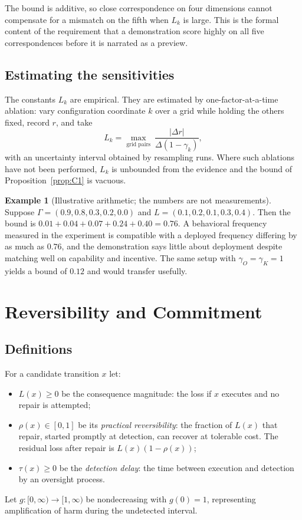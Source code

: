 \documentclass[11pt]{article}
\theoremstyle{definition}
\newtheorem{example}[theorem]{Example}
\begin{document}
The bound is additive, so close correspondence on four dimensions cannot compensate for a mismatch on the fifth when $L_k$ is large. This is the formal content of the requirement that a demonstration score highly on all five correspondences before it is narrated as a preview.

\subsection{Estimating the sensitivities}

The constants $L_k$ are empirical. They are estimated by one-factor-at-a-time ablation: vary configuration coordinate $k$ over a grid while holding the others fixed, record $r$, and take
\[
\hat L_k=\max_{\text{grid pairs}}\ \frac{|\Delta r|}{\Delta(1-\gamma_k)},
\]
with an uncertainty interval obtained by resampling runs. Where such ablations have not been performed, $L_k$ is unbounded from the evidence and the bound of Proposition~\ref{prop:C1} is vacuous.

\begin{example}[Illustrative arithmetic; the numbers are not measurements]
Suppose $\Gamma=(0.9,0.8,0.3,0.2,0.0)$ and $L=(0.1,0.2,0.1,0.3,0.4)$. Then the bound is $0.01+0.04+0.07+0.24+0.40=0.76$. A behavioral frequency measured in the experiment is compatible with a deployed frequency differing by as much as $0.76$, and the demonstration says little about deployment despite matching well on capability and incentive. The same setup with $\gamma_O=\gamma_K=1$ yields a bound of $0.12$ and would transfer usefully.
\end{example}

\section{Reversibility and Commitment}\label{app:D}

\subsection{Definitions}

For a candidate transition $x$ let:
\begin{itemize}[leftmargin=1.6em,itemsep=0.1em]
\item $L(x)\ge0$ be the consequence magnitude: the loss if $x$ executes and no repair is attempted;
\item $\rho(x)\in[0,1]$ be its \emph{practical reversibility}: the fraction of $L(x)$ that repair, started promptly at detection, can recover at tolerable cost. The residual loss after repair is $L(x)(1-\rho(x))$;
\item $\tau(x)\ge0$ be the \emph{detection delay}: the time between execution and detection by an oversight process.
\end{itemize}
Let $g:[0,\infty)\to[1,\infty)$ be nondecreasing with $g(0)=1$, representing amplification of harm during the undetected interval.
\end{document}
